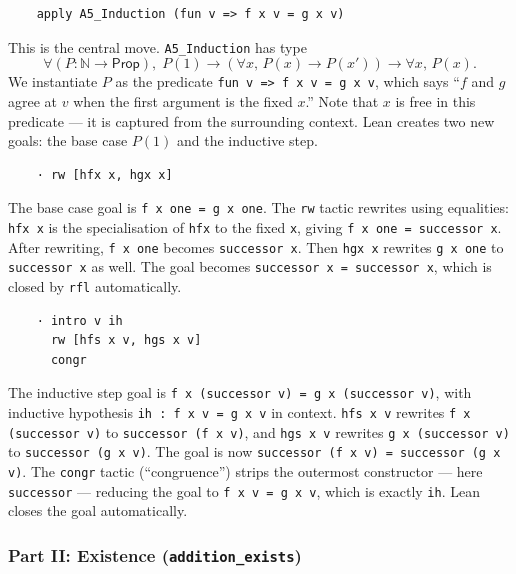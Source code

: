 \begin{verbatim}
    apply A5_Induction (fun v => f x v = g x v)
\end{verbatim}

\noindent
This is the central move. \verb|A5_Induction| has type
\[
  \forall (P : \mathbb{N} \to \mathsf{Prop}),\;
  P(1) \to
  (\forall x,\, P(x) \to P(x')) \to
  \forall x,\, P(x).
\]
We instantiate $P$ as the predicate \verb|fun v => f x v = g x v|,
which says ``$f$ and $g$ agree at $v$ when the first argument is the
fixed $x$.'' Note that $x$ is free in this predicate --- it is captured
from the surrounding context. Lean creates two new goals: the base case
$P(1)$ and the inductive step.

\begin{verbatim}
    · rw [hfx x, hgx x]
\end{verbatim}

\noindent
The base case goal is \verb|f x one = g x one|.
The \verb|rw| tactic rewrites using equalities: \verb|hfx x| is the
specialisation of \verb|hfx| to the fixed \verb|x|, giving
\verb|f x one = successor x|. After rewriting, \verb|f x one| becomes
\verb|successor x|. Then \verb|hgx x| rewrites \verb|g x one| to
\verb|successor x| as well. The goal becomes
\verb|successor x = successor x|, which is closed by \verb|rfl|
automatically.

\begin{verbatim}
    · intro v ih
      rw [hfs x v, hgs x v]
      congr
\end{verbatim}

\noindent
The inductive step goal is
\verb|f x (successor v) = g x (successor v)|,
with inductive hypothesis \verb|ih : f x v = g x v| in context.
\verb|hfs x v| rewrites \verb|f x (successor v)| to
\verb|successor (f x v)|, and \verb|hgs x v| rewrites
\verb|g x (successor v)| to \verb|successor (g x v)|.
The goal is now \verb|successor (f x v) = successor (g x v)|.
The \verb|congr| tactic (``congruence'') strips the outermost
constructor --- here \verb|successor| --- reducing the goal to
\verb|f x v = g x v|, which is exactly \verb|ih|. Lean closes
the goal automatically.

\subsubsection*{Part II: Existence (\texttt{addition\_exists})}


